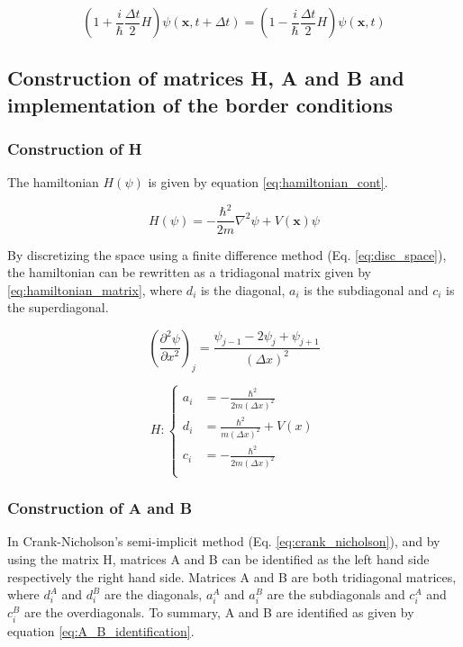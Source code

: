 \documentclass[a4paper,12pt,twoside]{article}
\newcommand{\mbf}[1]{\mathbf{#1}} %
\newcommand{\bracket}[1]{\left(#1\right)}
\begin{document}
    \begin{equation}
      \bracket{1 + \frac{i}{\hbar}\frac{\Delta t}{2}H}\psi(\mbf{x}, t + \Delta t) = \bracket{1 - \frac{i}{\hbar}\frac{\Delta t}{2}H}\psi(\mbf{x}, t)
      \label{eq:crank_nicholson}
    \end{equation}



  \subsection{Construction of matrices H, A and B and implementation of the border conditions}
    \subsubsection{Construction of H}\label{sec:constr_H}
      The hamiltonian $H(\psi)$ is given by equation \eqref{eq:hamiltonian_cont}.

      \begin{equation}
        H(\psi) = -\frac{\hbar^2}{2m}\nabla^2\psi + V(\mbf{x})\psi
        \label{eq:hamiltonian_cont}
      \end{equation}

      By discretizing the space using a finite difference method (Eq. \eqref{eq:disc_space}), the hamiltonian can be rewritten as a tridiagonal matrix given by \eqref{eq:hamiltonian_matrix}, where $d_i$ is the diagonal, $a_i$ is the subdiagonal and $c_i$ is the superdiagonal.

      \begin{equation}
        \bracket{\frac{\partial^2\psi}{\partial x^2}}_j = \frac{\psi_{j-1} - 2\psi_j + \psi_{j+1}}{\bracket{\Delta x}^2}
        \label{eq:disc_space}
      \end{equation}

      \begin{equation}
        H: \begin{cases}
          a_i &= -\frac{\hbar^2}{2m(\Delta x)^2}\\
          d_i &= \frac{\hbar^2}{m(\Delta x)^2} + V(x)\\
          c_i &= -\frac{\hbar^2}{2m(\Delta x)^2}\\
        \end{cases}
        \label{eq:hamiltonian_matrix}
      \end{equation}

    \subsubsection{Construction of A and B}
      In Crank-Nicholson's semi-implicit method (Eq. \eqref{eq:crank_nicholson}), and by using the matrix H, matrices A and B can be identified as the left hand side respectively the right hand side.
      Matrices A and B are both tridiagonal matrices, where $d_i^A$ and $d_i^B$ are the diagonals, $a_i^A$ and $a_i^B$ are the subdiagonals and $c_i^A$ and $c_i^B$ are the overdiagonals.
      To summary, A and B are identified as given by equation \eqref{eq:A_B_identification}.
\end{document}
